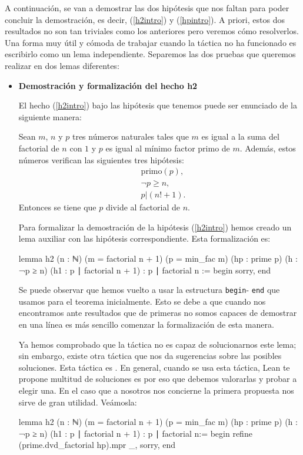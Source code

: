 A continuación, se van a demostrar las dos hipótesis que nos faltan para
poder concluir la demostración, es decir, (\ref{h2intro}) y (\ref{hpintro}).
A priori, estos dos resultados no son tan triviales como los anteriores pero
veremos cómo resolverlos. Una forma muy útil y cómoda de trabajar cuando la
táctica  no ha funcionado es escribirlo
como un lema independiente. Separemos las dos pruebas que queremos realizar en
dos lemas diferentes:
\begin{itemize}
\item \textbf{Demostración y formalización del hecho h2}

  El hecho (\ref{h2intro}) bajo las hipótesis que tenemos puede ser
  enunciado de la siguiente manera:
  \begin{lema}[h2]
    Sean \(m\), \(n\) y \(p\) tres números naturales tales que \(m\) es
    igual a la suma del factorial de \(n\) con \(1\) y \(p\) es igual al
    mínimo factor primo de \(m\). Además, estos números verifican las
    siguientes tres hipótesis:
    \begin{align}
      &\text{primo}(p),\label{hpintro}\tag{hp}\\
      &¬p ≥ n,         \tag{h}\label{hintro}\\
      &p | (n!+1).       \tag{h1}\label{h11intro}
    \end{align}
    Entonces se tiene que \(p\) divide al factorial de \(n\).
  \end{lema}

  Para formalizar la demostración de la hipótesis (\ref{h2intro}) hemos creado
  un lema auxiliar con las hipótesis correspondiente. Esta formalización es:
  \begin{leancode}
lemma h2
  (n : ℕ)
  (m = factorial n + 1)
  (p = min_fac m)
  (hp : prime p)
  (h : ¬p ≥ n)
  (h1 : p ∣ factorial n + 1)
  : p ∣ factorial n :=
  begin
    sorry,
end
  \end{leancode}

  Se puede observar que hemos vuelto a usar la estructura \texttt{begin}-
  \texttt{end} que usamos para el teorema inicialmente. Esto se debe a que
  cuando nos encontramos ante resultados que de primeras no somos capaces de
  demostrar en una línea es más sencillo comenzar la formalización de esta
  manera.

  Ya hemos comprobado que la táctica 
  no es capaz de solucionarnos este lema; sin embargo, existe otra táctica que
  nos da sugerencias sobre las posibles soluciones. Esta táctica es
  . En general, cuando se usa esta táctica, Lean te
  propone multitud de soluciones es por eso que debemos valorarlas y probar a
  elegir una. En el caso que a nosotros nos concierne la primera propuesta nos
  sirve de gran utilidad. Veámosla:
\begin{leancode}
lemma h2
  (n : ℕ)
  (m = factorial n + 1)
  (p = min_fac m)
  (hp : prime p)
  (h : ¬p ≥ n)
  (h1 : p ∣ factorial n + 1)
  : p ∣ factorial n:=
begin
  refine (prime.dvd_factorial hp).mpr _,
  sorry,
end
\end{leancode}


\end{itemize}
